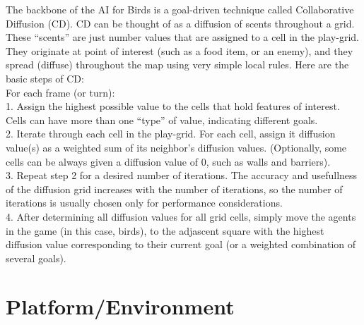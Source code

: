 \documentclass{article}
\begin{document}
The backbone of the AI for Birds is a goal-driven technique called Collaborative Diffusion (CD).  CD can be thought of as a diffusion of scents throughout a grid.  These ``scents'' are just number values that are assigned to a cell in the play-grid.  They originate at point of interest (such as a food item, or an enemy), and they spread (diffuse) throughout the map using very simple local rules.  Here are the basic steps of CD:
\\
For each frame (or turn):
\\
1. Assign the highest possible value to the cells that hold features of interest.  Cells can have more than one ``type'' of value, indicating different goals.
\\
2. Iterate through each cell in the play-grid.  For each cell, assign it diffusion value(s) as a weighted sum of its neighbor's diffusion values. (Optionally, some cells can be always given a diffusion value of $0$, such as walls and barriers).
\\
3. Repeat step 2 for a desired number of iterations.  The accuracy and usefullness of the diffusion grid increases with the number of iterations, so the number of iterations is usually chosen only for performance considerations.
\\
4. After determining all diffusion values for all grid cells, simply move the agents in the game (in this case, birds), to the adjascent square with the highest diffusion value corresponding to their current goal (or a weighted combination of several goals).
\\
\section*{Platform/Environment}
\end{document}
